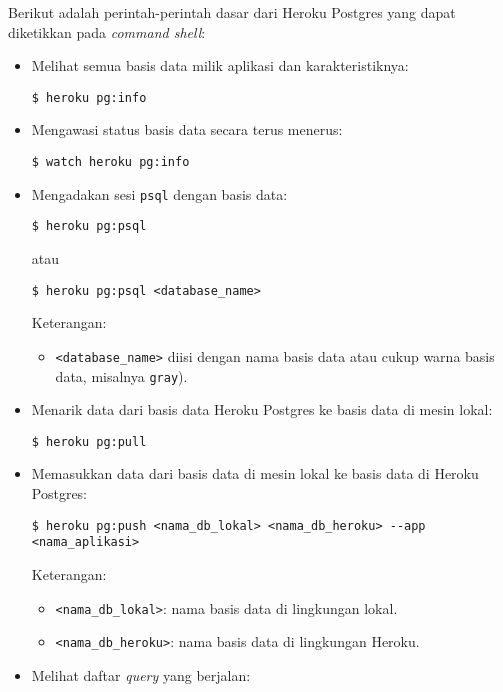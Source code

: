 Berikut adalah perintah-perintah dasar dari Heroku Postgres yang dapat diketikkan pada \textit{command shell}:
\begin{itemize}
\item Melihat semua basis data milik aplikasi dan karakteristiknya:
\begin{lstlisting}
$ heroku pg:info
\end{lstlisting}

\item Mengawasi status basis data secara terus menerus:
\begin{lstlisting}
$ watch heroku pg:info
\end{lstlisting}

\item Mengadakan sesi \texttt{psql} dengan basis data:
\begin{lstlisting}
$ heroku pg:psql
\end{lstlisting}
atau
\begin{lstlisting}
$ heroku pg:psql <database_name>
\end{lstlisting}
Keterangan:
\begin{itemize}
\item \texttt{<database\_name>} diisi dengan nama basis data atau cukup warna basis data, misalnya \texttt{gray}).
\end{itemize}

\item Menarik data dari basis data Heroku Postgres ke basis data di mesin lokal:

\begin{lstlisting}
$ heroku pg:pull
\end{lstlisting}

\item Memasukkan data dari basis data di mesin lokal ke basis data di Heroku Postgres:

\begin{lstlisting}
$ heroku pg:push <nama_db_lokal> <nama_db_heroku> --app <nama_aplikasi>
\end{lstlisting}
Keterangan:
\begin{itemize}
\item \texttt{<nama\_db\_lokal>}: nama basis data di lingkungan lokal.
\item \texttt{<nama\_db\_heroku>}: nama basis data di lingkungan Heroku.
\end{itemize}

\item Melihat daftar \textit{query} yang berjalan:


\end{itemize}

